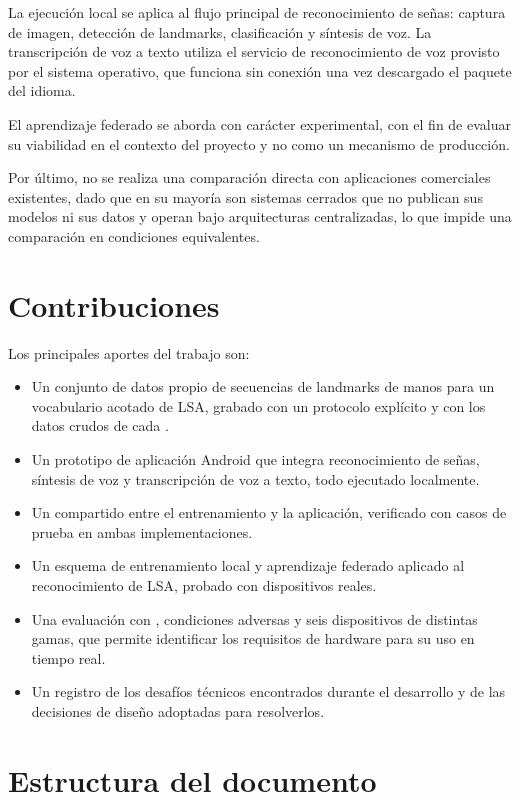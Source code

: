 La ejecución local se aplica al flujo principal de reconocimiento de señas: captura de imagen, detección de landmarks, clasificación y síntesis de voz. La transcripción de voz a texto utiliza el servicio de reconocimiento de voz provisto por el sistema operativo, que funciona sin conexión una vez descargado el paquete del idioma.

El aprendizaje federado se aborda con carácter experimental, con el fin de evaluar su viabilidad en el contexto del proyecto y no como un mecanismo de producción.

Por último, no se realiza una comparación directa con aplicaciones comerciales existentes, dado que en su mayoría son sistemas cerrados que no publican sus modelos ni sus datos y operan bajo arquitecturas centralizadas, lo que impide una comparación en condiciones equivalentes.

\section{Contribuciones}

Los principales aportes del trabajo son:

\begin{itemize}
    \item Un conjunto de datos propio de secuencias de landmarks de manos para un vocabulario acotado de LSA, grabado con un protocolo explícito y con los datos crudos de cada .
    \item Un prototipo de aplicación Android que integra reconocimiento de señas, síntesis de voz y transcripción de voz a texto, todo ejecutado localmente.
    \item Un  compartido entre el entrenamiento y la aplicación, verificado con casos de prueba en ambas implementaciones.
    \item Un esquema de entrenamiento local y aprendizaje federado aplicado al reconocimiento de LSA, probado con dispositivos reales.
    \item Una evaluación con , condiciones adversas y seis dispositivos de distintas gamas, que permite identificar los requisitos de hardware para su uso en tiempo real.
    \item Un registro de los desafíos técnicos encontrados durante el desarrollo y de las decisiones de diseño adoptadas para resolverlos.
\end{itemize}

\section{Estructura del documento}

